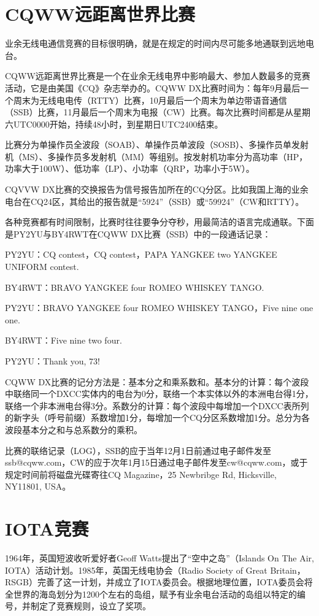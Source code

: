\documentclass[12pt,UTF8]{ctexbook}
\begin{document}
\section{CQWW远距离世界比赛}

业余无线电通信竞赛的目标很明确，就是在规定的时间内尽可能多地通联到远地电台。

CQWW远距离世界比赛是一个在业余无线电界中影响最大、参加人数最多的竞赛活动，它是由美国《CQ》杂志举办的。CQWW DX比赛时间为：每年9月最后一个周末为无线电电传（RTTY）比赛，10月最后一个周末为单边带语音通信（SSB）比赛，11月最后一个周末为电报（CW）比赛。每次比赛时间都是从星期六UTC0000开始，持续48小时，到星期日UTC2400结束。

比赛分为单操作员全波段（SOAB）、单操作员单波段（SOSB）、多操作员单发射机（MS）、多操作员多发射机（MM）等组别。按发射机功率分为高功率（HP，功率大于100W）、低功率（LP）、小功率（QRP，功率小于5W）。

CQVVW DX比赛的交换报告为信号报告加所在的CQ分区。比如我国上海的业余电台在CQ24区，其给出的报告就是“5924”（SSB）或“59924”（CW和RTTY）。

各种竞赛都有时间限制，比赛时往往要争分夺秒，用最简洁的语言完成通联。下面是PY2YU与BY4RWT在CQWW DX比赛（SSB）中的一段通话记录：

PY2YU：CQ contest，CQ contest，PAPA YANGKEE two YANGKEE UNIFORM contest.

BY4RWT：BRAVO YANGKEE four ROMEO WHISKEY TANGO.

PY2YU：BRAVO YANGKEE four ROMEO WHISKEY TANGO，Five nine one one.

BY4RWT：Five nine two four.

PY2YU：Thank you, 73!

CQWW DX比赛的记分方法是：基本分之和乘系数和。基本分的计算：每个波段中联络同一个DXCC实体内的电台为0分，联络一个本实体以外的本洲电台得1分，联络一个非本洲电台得3分。系数分的计算：每个波段中每增加一个DXCC表所列的新字头（呼号前缀）系数增加1分，每增加一个CQ分区系数增加1分。总分为各波段基本分之和与总系数分的乘积。

比赛的联络记录（LOG），SSB的应于当年12月1日前通过电子邮件发至ssb@cqww.com，CW的应于次年1月15日通过电子邮件发至cw@cqww.com，或于规定时间前将磁盘光碟寄往CQ Magazine，25 Newbribge Rd, Hicksville, NY11801, USA。

\section{IOTA竞赛}

1964年，英国短波收听爱好者Geoff Watts提出了“空中之岛”（Islands On The Air, IOTA）活动计划。1985年，英国无线电协会（Radio Society of Great Britain，RSGB）完善了这一计划，并成立了IOTA委员会。根据地理位置，IOTA委员会将全世界的海岛划分为1200个左右的岛组，赋予有业余电台活动的岛组以特定的编号，并制定了竞赛规则，设立了奖项。
\end{document}

